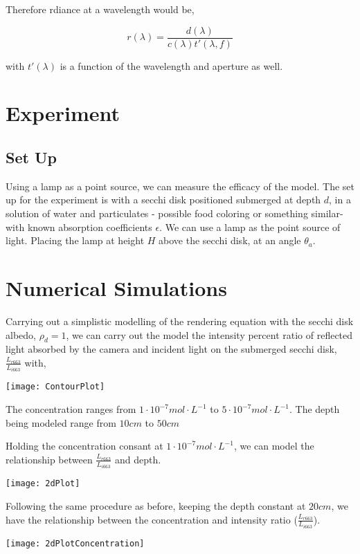 \documentclass{article}
\begin{document}
Therefore rdiance at a wavelength would be,

$$ r(\lambda) = \frac{d(\lambda)}{c(\lambda)t'(\lambda, f)} $$

with $t'(\lambda) $ is a function of the wavelength and aperture as well.
\section{Experiment}

\subsection{Set Up}
Using a lamp as a point source, we can measure the efficacy of the model. The set up for the experiment is
with a secchi disk positioned submerged at depth $d$, in a solution of water and particulates - possible food coloring
or something similar- with known absorption coefficients $ \epsilon$. We can use a lamp as the point source of light. Placing
the lamp at height $ H$ above the secchi disk, at an angle $\theta_a$.

\section{Numerical Simulations}

Carrying out a simplistic modelling of the rendering equation with the secchi disk albedo, $ \rho_d = 1$,
we can carry out the model the intensity percent ratio of reflected light absorbed by the camera and incident light on
the submerged secchi disk, $ \frac{L_{r663}}{L_{i 663}}$ with,
\begin{center}
    \texttt{[image: ContourPlot]}
\end{center}

The concentration ranges from $ 1 \cdot 10^{-7} mol\cdot L^{-1}$ to $5 \cdot 10^{-7} mol\cdot L^{-1}$. The depth being modeled
range from $10cm$ to $ 50cm$

Holding the concentration consant at $ 1 \cdot 10^{-7} mol\cdot L^{-1}$, we can model the
relationship between $ \frac{L_{r663}}{L_{i663}}$ and depth.
\begin{center}
    \texttt{[image: 2dPlot]}
\end{center}

Following the same procedure as before, keeping the depth constant at $ 20 cm$, we have the relationship between the
concentration and intensity ratio ($ \frac{L_{r663}}{L_{i663}}$).
\begin{center}
  \texttt{[image: 2dPlotConcentration]}
\end{center}
\end{document}
